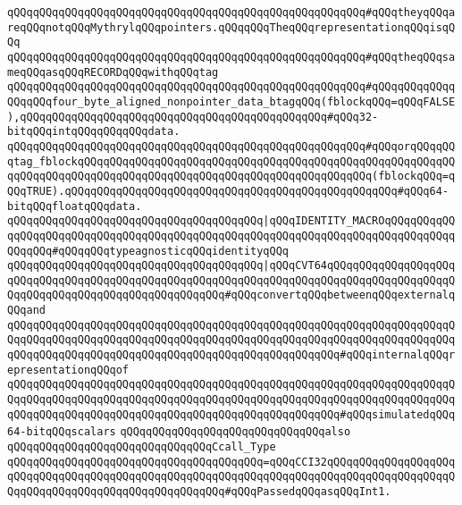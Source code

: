 \verb|qQQqqQQqqQQqqQQqqQQqqQQqqQQqqQQqqQQqqQQqqQQqqQQqqQQqqQQq#qQQqtheyqQQqareqQQqnotqQQqMythrylqQQqpointers.qQQqqQQqTheqQQqrepresentationqQQqisqQQq|\newline
\verb|qQQqqQQqqQQqqQQqqQQqqQQqqQQqqQQqqQQqqQQqqQQqqQQqqQQqqQQq#qQQqtheqQQqsameqQQqasqQQqRECORDqQQqwithqQQqtag|\newline
\verb|qQQqqQQqqQQqqQQqqQQqqQQqqQQqqQQqqQQqqQQqqQQqqQQqqQQqqQQq#qQQqqQQqqQQqqQQqqQQqfour_byte_aligned_nonpointer_data_btagqQQq(fblockqQQq=qQQqFALSE),qQQqqQQqqQQqqQQqqQQqqQQqqQQqqQQqqQQqqQQqqQQqqQQq#qQQq32-bitqQQqintqQQqqQQqqQQqdata.|\newline
\verb|qQQqqQQqqQQqqQQqqQQqqQQqqQQqqQQqqQQqqQQqqQQqqQQqqQQqqQQq#qQQqorqQQqqQQqtag_fblockqQQqqQQqqQQqqQQqqQQqqQQqqQQqqQQqqQQqqQQqqQQqqQQqqQQqqQQqqQQqqQQqqQQqqQQqqQQqqQQqqQQqqQQqqQQqqQQqqQQqqQQqqQQqqQQqqQQq(fblockqQQq=qQQqTRUE).qQQqqQQqqQQqqQQqqQQqqQQqqQQqqQQqqQQqqQQqqQQqqQQqqQQq#qQQq64-bitqQQqfloatqQQqdata.|\newline
\newline
\verb|qQQqqQQqqQQqqQQqqQQqqQQqqQQqqQQqqQQqqQQq|\verb#|qQQqIDENTITY_MACROqQQqqQQqqQQqqQQqqQQqqQQqqQQqqQQqqQQqqQQqqQQqqQQqqQQqqQQqqQQqqQQqqQQqqQQqqQQqqQQqqQQqqQQq#\verb|#qQQqqQQqtypeagnosticqQQqidentityqQQq|\newline
\newline
\verb|qQQqqQQqqQQqqQQqqQQqqQQqqQQqqQQqqQQqqQQq|\verb#|qQQqCVT64qQQqqQQqqQQqqQQqqQQqqQQqqQQqqQQqqQQqqQQqqQQqqQQqqQQqqQQqqQQqqQQqqQQqqQQqqQQqqQQqqQQqqQQqqQQqqQQqqQQqqQQqqQQqqQQqqQQqqQQqqQQq#\verb|#qQQqconvertqQQqbetweenqQQqexternalqQQqand|\newline
\verb|qQQqqQQqqQQqqQQqqQQqqQQqqQQqqQQqqQQqqQQqqQQqqQQqqQQqqQQqqQQqqQQqqQQqqQQqqQQqqQQqqQQqqQQqqQQqqQQqqQQqqQQqqQQqqQQqqQQqqQQqqQQqqQQqqQQqqQQqqQQqqQQqqQQqqQQqqQQqqQQqqQQqqQQqqQQqqQQqqQQqqQQqqQQqqQQq#qQQqinternalqQQqrepresentationqQQqof|\newline
\verb|qQQqqQQqqQQqqQQqqQQqqQQqqQQqqQQqqQQqqQQqqQQqqQQqqQQqqQQqqQQqqQQqqQQqqQQqqQQqqQQqqQQqqQQqqQQqqQQqqQQqqQQqqQQqqQQqqQQqqQQqqQQqqQQqqQQqqQQqqQQqqQQqqQQqqQQqqQQqqQQqqQQqqQQqqQQqqQQqqQQqqQQqqQQqqQQq#qQQqsimulatedqQQq64-bitqQQqscalars|\newline
\newline
\verb|qQQqqQQqqQQqqQQqqQQqqQQqqQQqqQQqalso|\newline
\verb|qQQqqQQqqQQqqQQqqQQqqQQqqQQqqQQqCcall_Type|\newline
\verb|qQQqqQQqqQQqqQQqqQQqqQQqqQQqqQQqqQQqqQQq=qQQqCCI32qQQqqQQqqQQqqQQqqQQqqQQqqQQqqQQqqQQqqQQqqQQqqQQqqQQqqQQqqQQqqQQqqQQqqQQqqQQqqQQqqQQqqQQqqQQqqQQqqQQqqQQqqQQqqQQqqQQqqQQqqQQq#qQQqPassedqQQqasqQQqInt1.|\newline
